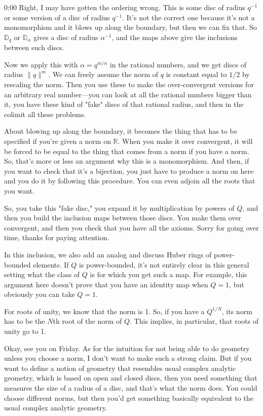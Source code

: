 \begin{unfinished}{0:00}
Right, I may have gotten the ordering wrong. This is some disc of radius $q^{-1}$ or some version of a disc of radius $q^{-1}$. It's not the correct one because it's not a monomorphism and it blows up along the boundary, but then we can fix that. So $\mathbb{D}_{q}$ or $\mathbb{D}_{\alpha}$ gives a disc of radius $\alpha^{-1}$, and the maps above give the inclusions between such discs.

Now we apply this with $\alpha = q^{m/n}$ in the rational numbers, and we get discs of radius $\|q\|^{m}$. We can freely assume the norm of $q$ is constant equal to $1/2$ by rescaling the norm. Then you use these to make the over-convergent versions for an arbitrary real number---you can look at all the rational numbers bigger than it, you have these kind of "fake" discs of that rational radius, and then in the colimit all these problems.


About blowing up along the boundary, it becomes the thing that has to be specified if you're given a norm on $\mathbb{R}$. When you make it over convergent, it will be forced to be equal to the thing that comes from a norm if you have a norm. So, that's more or less an argument why this is a monomorphism. And then, if you want to check that it's a bijection, you just have to produce a norm on here and you do it by following this procedure. You can even adjoin all the roots that you want.

So, you take this "fake disc," you expand it by multiplication by powers of $Q$, and then you build the inclusion maps between those discs. You make them over convergent, and then you check that you have all the axioms. Sorry for going over time, thanks for paying attention.

In this inclusion, we also add an analog and discuss Huber rings of power-bounded elements. If $Q$ is power-bounded, it's not entirely clear in this general setting what the class of $Q$ is for which you get such a map. For example, this argument here doesn't prove that you have an identity map when $Q = 1$, but obviously you can take $Q = 1$.

For roots of unity, we know that the norm is 1. So, if you have a $Q^{1/N}$, its norm has to be the $N$th root of the norm of $Q$. This implies, in particular, that roots of unity go to 1.

Okay, see you on Friday. As for the intuition for not being able to do geometry unless you choose a norm, I don't want to make such a strong claim. But if you want to define a notion of geometry that resembles usual complex analytic geometry, which is based on open and closed discs, then you need something that measures the size of a radius of a disc, and that's what the norm does. You could choose different norms, but then you'd get something basically equivalent to the usual complex analytic geometry.


\end{unfinished}
